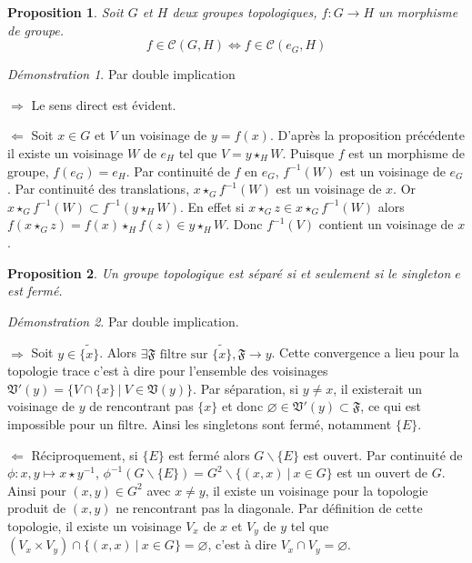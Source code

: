 \documentclass[a4paper, 11pt, french]{book}
\newenvironment{itemise}{\itemize}{\enditemize}
\theoremstyle{plain} %
\newtheorem{proposition}{Proposition}
\theoremstyle{definition} %
\theoremstyle{remark} %
\newtheorem*{demonstration}{Démonstration}
\renewcommand{\setminus}{\backslash}
\newcommand{\1}{\mathds{1}}
\newcommand\vide{\varnothing}
\newcommand{\cont}{\mathcal{C}}
\newcommand{\inv}[1]{#1^{-1}}
\newcommand\ens[2]{\{#1 \ |\ #2\}}
\begin{document}
\begin{proposition}
	Soit $G$ et $H$ deux groupes topologiques, $f:G\rightarrow H$ un morphisme de groupe.
	$$
		f\in\cont(G, H)\iff f\in\cont(e_G, H)
	$$
\end{proposition}

\begin{demonstration}
	Par double implication
	\begin{itemise}
		\item[$\Rightarrow$] Le sens direct est évident.
		\item[$\Leftarrow$] Soit $x\in G$ et $V$ un voisinage de $y=f(x)$.
		D'après la proposition précédente il existe un voisinage $W$ de $e_H$ tel que $V=y\star_HW$.
		Puisque $f$ est un morphisme de groupe, $f(e_G)=e_H$.
		Par continuité de $f$ en $e_G$, $\inv{f}(W)$ est un voisinage de $e_G$.
		Par continuité des translations, $x\star_G\inv{f}(W)$ est un voisinage de $x$.
		Or $x\star_G\inv{f}(W)\subset\inv{f}(y\star_HW)$.
		En effet si $x\star_Gz\in x\star_G\inv{f}(W)$ alors $f(x\star_Gz)=f(x)\star_Hf(z)\in y\star_HW$.
		Donc $\inv{f}(V)$ contient un voisinage de $x$.
	\end{itemise}
\end{demonstration}

\begin{proposition}
	Un groupe topologique est séparé si et seulement si le singleton ${e}$ est fermé.
\end{proposition}

\begin{demonstration}
	Par double implication.
	\begin{itemise}
		\item[$\Rightarrow$] Soit $y\in\widetilde{\{x\}}$.
		Alors $\exists\mathfrak{F}\text{ filtre sur $\widetilde{\{x\}}$}, \mathfrak{F}\rightarrow y$.
		Cette convergence a lieu pour la topologie trace c'est à dire pour l'ensemble des voisinages $\mathfrak{V}'(y)=\{V\cap\ens{x\}}{V\in\mathfrak{V}(y)}$.
		Par séparation, si $y\neq x$, il existerait un voisinage de $y$ de rencontrant pas $\{x\}$ et donc $\vide\in\mathfrak{V}'(y)\subset\mathfrak{F}$, ce qui est impossible pour un filtre.
		Ainsi les singletons sont fermé, notamment $\{E\}$.
		\item[$\Leftarrow$] Réciproquement, si $\{E\}$ est fermé alors $G\setminus\{E\}$ est ouvert.
		Par continuité de $\phi:x, y\longmapsto x\star\inv{y}$, $\inv{\phi}(G\setminus\{E\})=G^2\setminus\ens{(x, x)}{x\in G}$ est un ouvert de $G$.
		Ainsi pour $(x, y)\in G^2$ avec $x\neq y$, il existe un voisinage pour la topologie produit de $(x, y)$ ne rencontrant pas la diagonale.
		Par définition de cette topologie, il existe un voisinage $V_x$ de $x$ et $V_y$ de $y$ tel que $(V_x\times V_y)\cap\ens{(x, x)}{x\in G}=\vide$, c'est à dire $V_x\cap V_y=\vide$.
	\end{itemise}
\end{demonstration}
\end{document}
